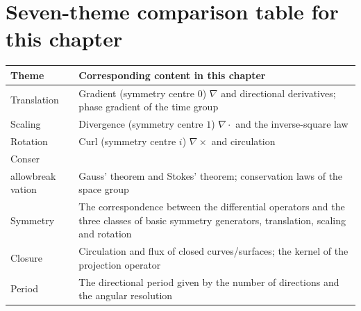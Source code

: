 \section*{Seven-theme comparison table for this chapter}

\begin{center}
\renewcommand{\arraystretch}{1.3}
\begin{tabularx}{\linewidth}{@{}>{\raggedright\arraybackslash}p{3.5cm}>{\raggedright\arraybackslash}X@{}}
\toprule
Theme & Corresponding content in this chapter \\
\midrule
Translation & Gradient (symmetry centre $0$) $\nabla$ and directional derivatives; phase gradient of the time group \\
Scaling & Divergence (symmetry centre $1$) $\nabla\cdot$ and the inverse-square law \\
Rotation & Curl (symmetry centre $i$) $\nabla\times$ and circulation \\
Conser\\allowbreak vation & Gauss' theorem and Stokes' theorem; conservation laws of the space group \\
Symmetry & The correspondence between the differential operators and the three classes of basic symmetry generators, translation, scaling and rotation \\
Closure & Circulation and flux of closed curves/surfaces; the kernel of the projection operator \\
Period & The directional period given by the number of directions and the angular resolution \\
\bottomrule
\end{tabularx}
\end{center}
